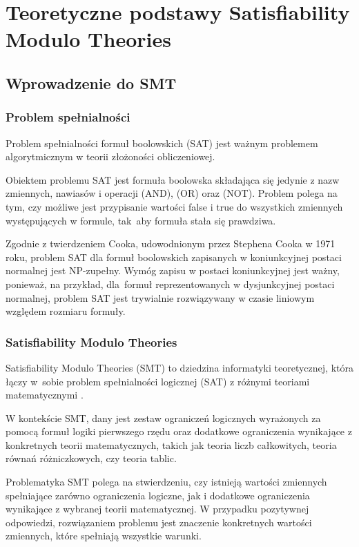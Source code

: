 \chapter{Teoretyczne podstawy Satisfiability Modulo Theories}

\section{Wprowadzenie do SMT}

\subsection{Problem spełnialności}
Problem spełnialności formuł boolowskich (SAT) jest ważnym problemem algorytmicznym w teorii złożoności obliczeniowej.

Obiektem problemu SAT jest formuła boolowska składająca się jedynie z nazw zmiennych, nawiasów i operacji 
{\wedge} (AND), {\vee} (OR) oraz {\neg} (NOT). Problem polega na tym, czy możliwe jest przypisanie wartości false i true do wszystkich zmiennych występujących w formule, tak~aby formuła stała się prawdziwa.

Zgodnie z twierdzeniem Cooka, udowodnionym przez Stephena Cooka w 1971 roku, problem SAT dla formuł boolowskich zapisanych w koniunkcyjnej postaci normalnej jest NP-zupełny. Wymóg zapisu w postaci koniunkcyjnej jest ważny, ponieważ, na przykład, dla~formuł reprezentowanych w dysjunkcyjnej postaci normalnej, problem SAT jest trywialnie rozwiązywany w czasie liniowym względem rozmiaru formuły.

\subsection{Satisfiability Modulo Theories}
Satisfiability Modulo Theories (SMT) to dziedzina informatyki teoretycznej, która łączy w~sobie problem spełnialności logicznej (SAT) z różnymi teoriami matematycznymi \cite{MouraB11}. 

W kontekście SMT, dany jest zestaw ograniczeń logicznych wyrażonych za pomocą formuł logiki pierwszego rzędu oraz dodatkowe ograniczenia wynikające z konkretnych teorii matematycznych, takich jak teoria liczb całkowitych, teoria równań różniczkowych, czy teoria tablic.

Problematyka SMT polega na stwierdzeniu, czy istnieją wartości zmiennych spełniające zarówno ograniczenia logiczne, jak i dodatkowe ograniczenia wynikające z wybranej teorii matematycznej. W przypadku pozytywnej odpowiedzi, rozwiązaniem problemu jest znaczenie konkretnych wartości zmiennych, które spełniają wszystkie warunki.
	
